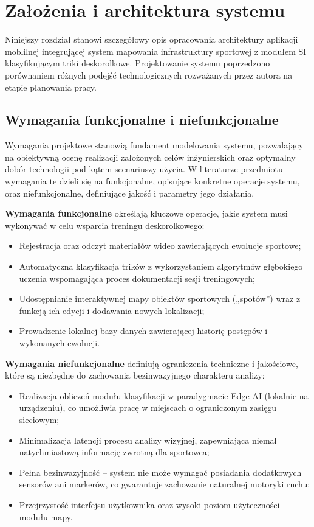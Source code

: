 \newpage
\section{Założenia i architektura systemu}
    Niniejszy rozdział stanowi szczegółowy opis opracowania architektury aplikacji moblilnej integrującej system mapowania infrastruktury sportowej z modułem SI klasyfikującym triki deskorolkowe. Projektowanie systemu poprzedzono porównaniem różnych podejść technologicznych rozważanych przez autora na etapie planowania pracy.

    \subsection{Wymagania funkcjonalne i niefunkcjonalne}

        Wymagania projektowe stanowią fundament modelowania systemu, pozwalający na obiektywną ocenę realizacji założonych celów inżynierskich oraz optymalny dobór technologii pod kątem scenariuszy użycia. W literaturze przedmiotu wymagania te dzieli się na funkcjonalne, opisujące konkretne operacje systemu, oraz niefunkcjonalne, definiujące jakość i parametry jego działania.

        \textbf{Wymagania funkcjonalne} określają kluczowe operacje, jakie system musi wykonywać w celu wsparcia treningu deskorolkowego:
        \begin{itemize}
            \item Rejestracja oraz odczyt materiałów wideo zawierających ewolucje sportowe;
            \item Automatyczna klasyfikacja trików z wykorzystaniem algorytmów głębokiego uczenia wspomagająca proces dokumentacji sesji treningowych;
            \item Udostępnianie interaktywnej mapy obiektów sportowych („spotów”) wraz z funkcją ich edycji i dodawania nowych lokalizacji;
            \item Prowadzenie lokalnej bazy danych zawierającej historię postępów i wykonanych ewolucji.
        \end{itemize}

        \textbf{Wymagania niefunkcjonalne} definiują ograniczenia techniczne i jakościowe, które są niezbędne do zachowania bezinwazyjnego charakteru analizy:
        \begin{itemize}
            \item Realizacja obliczeń modułu klasyfikacji w paradygmacie Edge AI (lokalnie na urządzeniu), co umożliwia pracę w miejscach o ograniczonym zasięgu sieciowym;
            \item Minimalizacja latencji procesu analizy wizyjnej, zapewniająca niemal natychmiastową informację zwrotną dla sportowca;
            \item Pełna bezinwazyjność – system nie może wymagać posiadania dodatkowych sensorów ani markerów, co gwarantuje zachowanie naturalnej motoryki ruchu;
            \item Przejrzystość interfejsu użytkownika oraz wysoki poziom użyteczności modułu mapy.
        \end{itemize}

